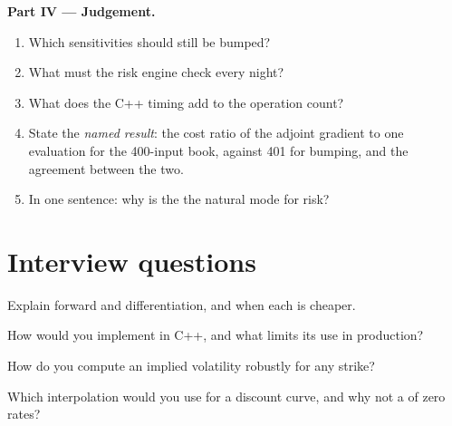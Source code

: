 \begin{problem}
\medskip\noindent\textbf{Part IV --- Judgement.}
\begin{enumerate}[resume]
\item Which sensitivities should still be bumped?
\item What must the risk engine check every night?
\item What does the C++ timing add to the operation count?
\item State the \emph{named result}: the cost ratio of the adjoint gradient to one evaluation for the 400-input book, against 401 for bumping, and the agreement between the two.
\item In one sentence: why is the  the natural mode for risk?
\end{enumerate}
\end{problem}

\section{Interview questions}

\begin{interviewq}\label{iq:qm:transforms-interpolation-and-algorithmic-differentiation:1}
Explain forward and  differentiation, and when each is cheaper.
\end{interviewq}

\begin{interviewq}\label{iq:qm:transforms-interpolation-and-algorithmic-differentiation:2}
How would you implement  in C++, and what limits its use in production?
\end{interviewq}

\begin{interviewq}\label{iq:qm:transforms-interpolation-and-algorithmic-differentiation:3}
How do you compute an implied volatility robustly for any strike?
\end{interviewq}

\begin{interviewq}\label{iq:qm:transforms-interpolation-and-algorithmic-differentiation:4}
Which interpolation would you use for a discount curve, and why not a  of zero rates?
\end{interviewq}

